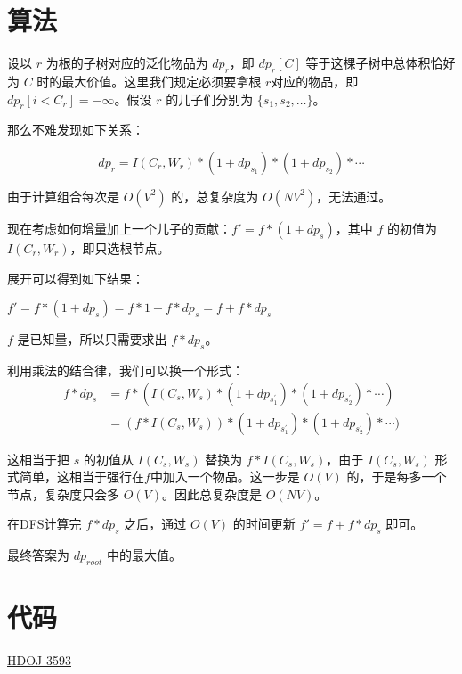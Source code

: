 \documentclass{article}
\begin{document}
\section{算法}

设以 $r$ 为根的子树对应的泛化物品为 $dp_r$，即 $dp_r[C]$ 等于这棵子树中总体积恰好为 $C$ 时的最大价值。这里我们规定必须要拿根 $r$对应的物品，即 $dp_r[i<C_r] = -\infty$。假设 $r$ 的儿子们分别为 $\{s_1,s_2,\ldots \}$。

那么不难发现如下关系：

$$
dp_r = I(C_r,W_r) * (1+dp_{s_1})* (1+dp_{s_2}) * \cdots
$$

由于计算组合每次是 $O(V^2)$ 的，总复杂度为 $O(NV^2)$，无法通过。

现在考虑如何增量加上一个儿子的贡献：$f' = f * (1+dp_s)$，其中 $f$ 的初值为 $I(C_r,W_r)$，即只选根节点。

展开可以得到如下结果：
\begin{center}
    $f' = f * (1+dp_s) = f*1 + f*dp_s = f + f*dp_s$
\end{center}

$f$ 是已知量，所以只需要求出 $f*dp_s$。

利用乘法的结合律，我们可以换一个形式：
\begin{align*}
    f*dp_s
    &= f * (I(C_s,W_s) * (1+dp_{s_{1}^{\prime}})* (1+dp_{s_2^{\prime}}) * \cdots)\\
    &= (f * I(C_s,W_s)) * (1+dp_{s_{1}^{\prime}})* (1+dp_{s_2^{\prime}}) * \cdots)
\end{align*}

这相当于把 $s$ 的初值从 $I(C_s,W_s)$ 替换为 $f * I(C_s,W_s)$，由于 $I(C_s,W_s)$ 形式简单，这相当于强行在$f$中加入一个物品。这一步是 $O(V)$ 的，于是每多一个节点，复杂度只会多 $O(V)$。因此总复杂度是 $O(NV)$。

在DFS计算完 $f*dp_s$ 之后，通过 $O(V)$ 的时间更新 $f' = f+f*dp_s$ 即可。

最终答案为 $dp_{root}$ 中的最大值。

\section{代码}
\href{https://gist.github.com/SamZhangQingChuan/7c15974f308a45d6fcb114d029b4eda8}{HDOJ 3593}
\end{document}
